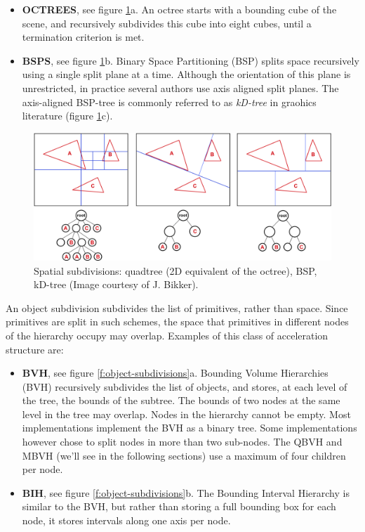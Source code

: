 \begin{itemize}
  \item \textbf{OCTREES}, see figure \ref{f:spatial-subdivisions}a. An octree starts with a bounding cube of the scene, and recursively subdivides this cube into eight cubes, until a termination criterion is met.
  \item \textbf{BSPS}, see figure \ref{f:spatial-subdivisions}b. Binary Space Partitioning (BSP) splits space recursively using a single split plane at a time. Although the orientation of this plane is unrestricted, in practice several authors use axis aligned split planes. The axis-aligned BSP-tree is commonly referred to as \textit{kD-tree} in graohics literature (figure \ref{f:spatial-subdivisions}c).
\end{itemize}

\begin{figure}\label{f:spatial-subdivisions}
	\begin{center}
		\includegraphics[width=1.\textwidth]{graphics/gi/path-17-1}
	\end{center}
	\caption{Spatial subdivisions: quadtree (2D equivalent of the octree), BSP, kD-tree (Image courtesy of J. Bikker).}
\end{figure}

An object subdivision subdivides the list of primitives, rather than space. Since primitives are split in such schemes, the space that primitives in different nodes of the hierarchy occupy may overlap. Examples of this class of acceleration structure are:

\begin{itemize}
	\item \textbf{BVH}, see figure \ref{f:object-subdivisions}a. Bounding Volume Hierarchies (BVH) recursively subdivides the list of objects, and stores, at each level of the tree, the bounds of the subtree. The bounds of two nodes at the same level in the tree may overlap. Nodes in the hierarchy cannot be empty. Most implementations implement the BVH as a binary tree. Some implementations however chose to split nodes in more than two sub-nodes. The QBVH and MBVH (we'll see in the following sections) use a maximum of four children per node.
	\item \textbf{BIH}, see figure \ref{f:object-subdivisions}b. The Bounding Interval Hierarchy is similar to the BVH, but rather than storing a full bounding box for each node, it stores intervals along one axis per node.
\end{itemize}


